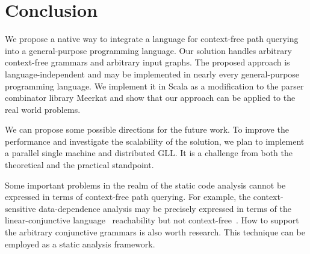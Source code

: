 \section{Conclusion}
\label{sec:conclusion}

We propose a native way to integrate a language for context-free path querying into a general-purpose programming language.
Our solution handles arbitrary context-free grammars and arbitrary input graphs.
The proposed approach is language-independent and may be implemented in nearly every general-purpose programming language.
We implement it in Scala as a modification to the parser combinator library Meerkat and show that our approach can be applied to the real world problems.

We can propose some possible directions for the future work.
To improve the performance and investigate the scalability of the solution, we plan to implement a parallel single machine and distributed GLL.
It is a challenge from both the theoretical and the practical standpoint.

Some important problems in the realm of the static code analysis cannot be expressed in terms of context-free path querying.
For example, the context-sensitive data-dependence analysis may be precisely expressed in terms of the linear-conjunctive language~\cite{Okhotin2003LCL} reachability but not context-free~\cite{LCLReachability}.
How to support the arbitrary conjunctive grammars is also worth research.
This technique can be employed as a static analysis framework.